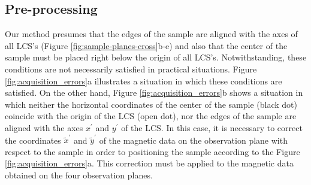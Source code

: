 \documentclass[draft,gc]{agutex}
\begin{document}
\begin{article}
\subsection{Pre-processing}
\label{subsec:Pre-processing}

Our method presumes that the edges of the sample are 
aligned with the axes of all LCS's (Figure 
\ref{fig:sample-planes-cross}b-e) and also that the 
center of the sample must be placed right
below the origin of all LCS's.
Notwithstanding, these conditions are not necessarily satisfied
in practical situations.
Figure \ref{fig:acquisition_errors}a illustrates a situation
in which these conditions are satisfied.
On the other hand, Figure \ref{fig:acquisition_errors}b 
shows a situation in which neither the horizontal coordinates of 
the center of the sample (black dot) coincide with the origin of 
the LCS (open dot), nor the edges of the sample are aligned with
the axes $x^{\prime}$ and $y^{\prime}$ of the LCS.
In this case, it is necessary to correct the coordinates
$\tilde{x}^{\prime}$ and $\tilde{y}^{\prime}$ of the 
magnetic data on the observation plane with respect to the sample 
in order to positioning the sample according to the Figure
\ref{fig:acquisition_errors}a.
This correction must be applied to the
magnetic data obtained on the four observation planes.


\end{article}
\end{document}

